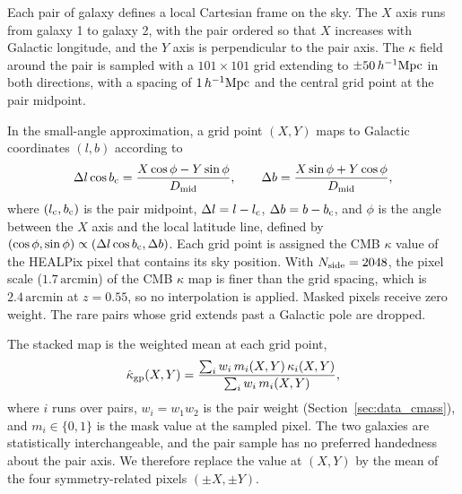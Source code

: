 \documentclass[preprint]{aastex701}
\newcommand{\hinvMpc}{h^{-1}{\rm Mpc}}
\begin{document}

Each pair of galaxy defines a local Cartesian frame on the sky. The $X$ axis runs from
galaxy 1 to galaxy 2, with the pair ordered so that $X$ increases with
Galactic longitude, and the $Y$ axis is perpendicular to the pair axis. 
The $\kappa$ field around the pair is sampled with a $101\times101$ grid extending
to $\pm50\,\hinvMpc$ in both directions, with a spacing of
$1\,\hinvMpc$ and the central grid point at the pair midpoint.

In the small-angle approximation, a grid point $(X,Y)$ maps to Galactic coordinates $(l, b)$ according to
\begin{equation}
  \Delta l\cos b_{\rm c} = \frac{X\cos\phi - Y\sin\phi}{D_{\rm mid}}, \qquad
  \Delta b = \frac{X\sin\phi + Y\cos\phi}{D_{\rm mid}},
  \label{eq:grid_to_sky}
\end{equation}
where $(l_{\rm c},b_{\rm c})$ is the pair midpoint, $\Delta l = l-l_{\rm c}$, $\Delta b = b-b_{\rm c}$, and $\phi$ is the angle between the $X$ axis and the local latitude line, defined by
$(\cos\phi,\sin\phi)\propto(\Delta l\cos b_{\rm c},\Delta b)$.
Each grid point is assigned the CMB $\kappa$ value of the HEALPix pixel that contains its sky position. With $N_{\rm side}=2048$, the pixel scale ($1.7\,\mathrm{arcmin}$) of the CMB $\kappa$ map is
finer than the grid spacing, which is $2.4\,\mathrm{arcmin}$ at $z=0.55$,
so no interpolation is applied. Masked pixels receive zero weight. The rare
pairs whose grid extends past a Galactic pole are dropped.

The stacked map is the weighted mean at each grid point,
\begin{equation}
  \hat\kappa_{\rm gp}(X,Y) = \frac{\sum_{i} w_{i}\,m_{i}(X,Y)\,\kappa_{i}(X,Y)}
                         {\sum_{i} w_{i}\,m_{i}(X,Y)},
  \label{eq:stack}
\end{equation}
where $i$ runs over pairs, $w_{i}=w_{1}w_{2}$ is the pair weight
(Section~\ref{sec:data_cmass}), and $m_{i}\in\{0,1\}$ is the mask value at
the sampled pixel. The two galaxies are statistically interchangeable, and
the pair sample has no preferred handedness about the pair axis. We therefore
replace the value at $(X,Y)$ by the mean of the four symmetry-related pixels
$(\pm X,\pm Y)$.
\end{document}
